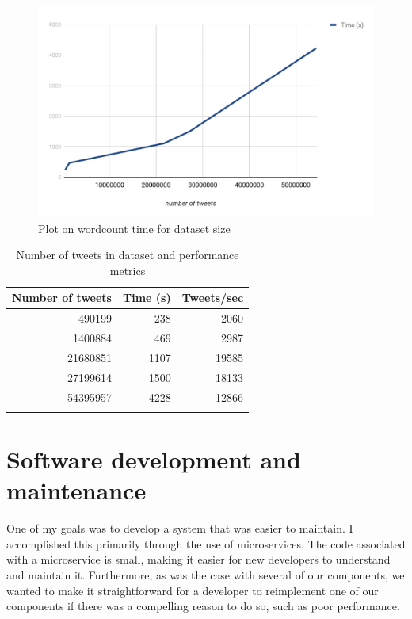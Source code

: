 \begin{figure}
\centering
\includegraphics[width=\textwidth]{Figures/wordcountplot}
\decoRule
\caption[Wordcount time plot]{Plot on wordcount time for dataset size}
\label{fig:wordcountplot}
\end{figure}

\begin{table}
\centering
\begin{tabular}{r r r}
\toprule
\textbf{Number of tweets} & \textbf{Time (s)} & \textbf{Tweets/sec}\\
\midrule
490199 & 238 & 2060 \\
1400884 & 469 & 2987 \\
21680851 & 1107 & 19585 \\
27199614 & 1500 & 18133 \\
54395957 & 4228 & 12866 \\
\bottomrule\\
\end{tabular}
\caption{Number of tweets in dataset and performance metrics}
\label{tab:numtweets}
\end{table}

\section{Software development and maintenance}

One of my goals was to develop a system that was easier to maintain. I accomplished this primarily through the use of microservices. The code associated with a microservice is small, making it easier for new developers to understand and maintain it. Furthermore, as was the case with several of our components, we wanted to make it straightforward for a developer to reimplement one of our components if there was a compelling reason to do so, such as poor performance.

